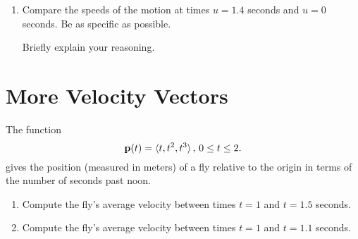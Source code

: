 \documentclass{ximera}
\begin{document}
\begin{exploration}
\begin{question}
\begin{enumerate}


\item Compare the speeds of the motion at times $u=1.4$ seconds and $u=0$ seconds. Be as specific as possible.
\begin{freeResponse}
Briefly explain your reasoning.
\end{freeResponse}


\end{enumerate}
\end{question}


 
\begin{onlineOnly}
    \begin{center}
\end{center}
\end{onlineOnly}


\section{More Velocity Vectors}
\begin{question}  \label{Qd34trgetgyt}
The function
\[
 {\bf p}(t) = \langle t, t^2, t^3 \rangle \, , \, 0\leq t \leq 2 .
\]
gives the position (measured in meters) of a fly relative to the origin in terms of the number of seconds past noon.  

\begin{enumerate}
\item Compute the fly's average velocity  between times $t=1$ and $t=1.5$ seconds.

\item Compute the fly's average velocity  between times $t=1$ and $t=1.1$ seconds.


\end{enumerate}
\end{question}
\end{exploration}
\end{document}
